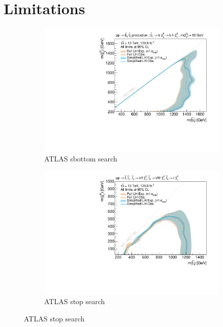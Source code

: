 \section{Limitations}\label{sec:simplify_limitations}

\begin{figure}
	\centering
	\begin{subfigure}[b]{0.5\textwidth}
		\centering\includegraphics[width=\textwidth]{exclusion_sbottom_noLabel_v2}
		\caption{ATLAS sbottom search~\cite{SUSY-2018-31}\label{fig:results_sbottom}}
	\end{subfigure}\hfill
	\begin{subfigure}[b]{0.5\textwidth}
		\centering\includegraphics[width=\textwidth]{exclusion_stop1L_noLabel_v2}
		\caption{ATLAS stop search\label{fig:results_stop1L}}
	\end{subfigure}\hfill

\end{figure}

